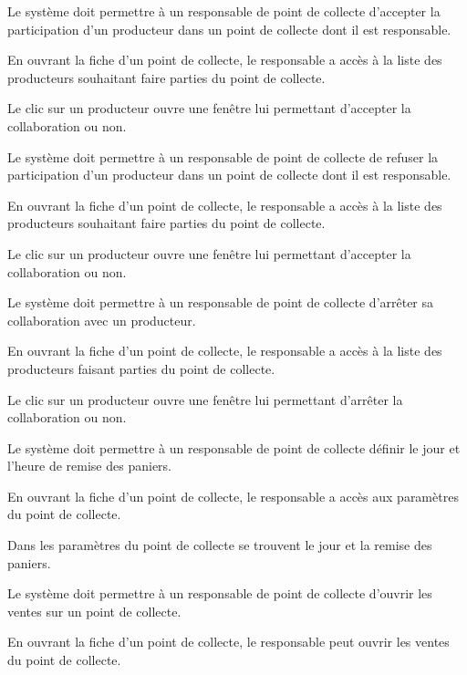 \begin{reqf}{Le système doit permettre à un responsable de point de collecte d'accepter la participation d'un producteur dans un point de collecte dont il est responsable.}
\item En ouvrant la fiche d'un point de collecte, le responsable a accès à la liste des producteurs souhaitant faire parties du point de collecte.
\item Le clic sur un producteur ouvre une fenêtre lui permettant d'accepter la collaboration ou non.
\end{reqf}

\begin{reqf}{Le système doit permettre à un responsable de point de collecte de refuser la participation d'un producteur dans un point de collecte dont il est responsable.}
\item En ouvrant la fiche d'un point de collecte, le responsable a accès à la liste des producteurs souhaitant faire parties du point de collecte.
\item Le clic sur un producteur ouvre une fenêtre lui permettant d'accepter la collaboration ou non.
\end{reqf}

\begin{reqf}{Le système doit permettre à un responsable de point de collecte d'arrêter sa collaboration avec un producteur.}
\item En ouvrant la fiche d'un point de collecte, le responsable a accès à la liste des producteurs faisant parties du point de collecte.
\item Le clic sur un producteur ouvre une fenêtre lui permettant d'arrêter la collaboration ou non.
\end{reqf}

\begin{reqf}{Le système doit permettre à un responsable de point de collecte définir le jour et l'heure de remise des paniers.}
\item En ouvrant la fiche d'un point de collecte, le responsable a accès aux paramètres du point de collecte.
\item Dans les paramètres du point de collecte se trouvent le jour et la remise des paniers.
\end{reqf}

\begin{reqf}{Le système doit permettre à un responsable de point de collecte d'ouvrir les ventes sur un point de collecte.}
\item En ouvrant la fiche d'un point de collecte, le responsable peut ouvrir les ventes du point de collecte.
\end{reqf}

